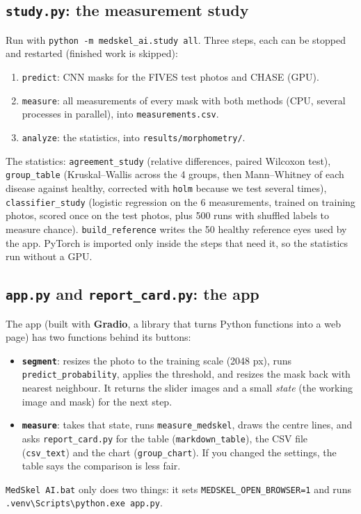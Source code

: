 \subsection{\texttt{study.py}: the measurement study}
Run with \texttt{python -m medskel\_ai.study all}. Three steps, each can be stopped and restarted (finished work is skipped):
\begin{enumerate}
  \item \texttt{predict}: CNN masks for the FIVES test photos and CHASE (GPU).
  \item \texttt{measure}: all measurements of every mask with both methods (CPU, several processes in parallel), into \texttt{measurements.csv}.
  \item \texttt{analyze}: the statistics, into \texttt{results/morphometry/}.
\end{enumerate}
The statistics: \texttt{agreement\_study} (relative differences, paired Wilcoxon test), \texttt{group\_table} (Kruskal--Wallis across the 4 groups, then Mann--Whitney of each disease against healthy, corrected with \texttt{holm} because we test several times), \texttt{classifier\_study} (logistic regression on the 6 measurements, trained on training photos, scored once on the test photos, plus 500 runs with shuffled labels to measure chance). \texttt{build\_reference} writes the 50 healthy reference eyes used by the app. PyTorch is imported only inside the steps that need it, so the statistics run without a GPU.

\subsection{\texttt{app.py} and \texttt{report\_card.py}: the app}
The app (built with \textbf{Gradio}, a library that turns Python functions into a web page) has two functions behind its buttons:
\begin{itemize}
  \item \textbf{\texttt{segment}}: resizes the photo to the training scale (2048 px), runs \texttt{predict\_probability}, applies the threshold, and resizes the mask back with nearest neighbour. It returns the slider images and a small \emph{state} (the working image and mask) for the next step.
  \item \textbf{\texttt{measure}}: takes that state, runs \texttt{measure\_medskel}, draws the centre lines, and asks \texttt{report\_card.py} for the table (\texttt{markdown\_table}), the CSV file (\texttt{csv\_text}) and the chart (\texttt{group\_chart}). If you changed the settings, the table says the comparison is less fair.
\end{itemize}
\texttt{MedSkel AI.bat} only does two things: it sets \texttt{MEDSKEL\_OPEN\_BROWSER=1} and runs \texttt{.venv\textbackslash Scripts\textbackslash python.exe app.py}.

